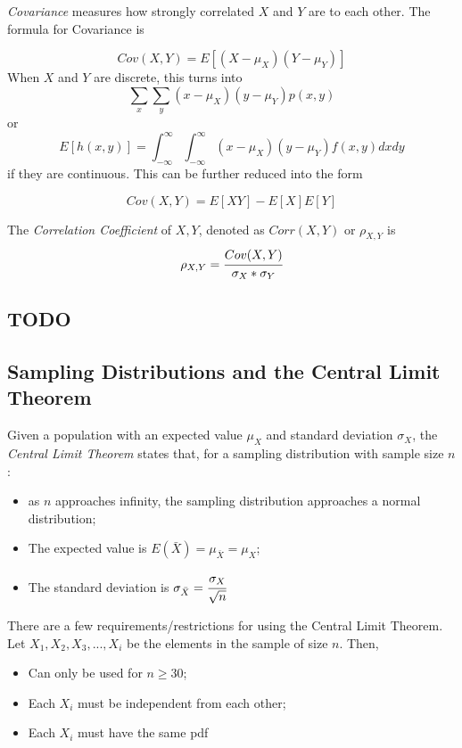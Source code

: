 \documentclass[10pt,twoside,a4paper]{article}
\begin{document}
\begin{multicols*}{2}
\begin{flushleft}
	\textit{Covariance} measures how strongly correlated $X$ and $Y$ are to each other.
	The formula for Covariance is 

	$$ Cov(X, Y) = E[(X - \mu_X)(Y - \mu_Y)] $$
	When $X$ and $Y$ are discrete, this turns into
	$$ \sum_x\sum_y (x - \mu_X)(y - \mu_Y)p(x, y) $$
	or 
	$$ E[h(x,y)] = \int_{-\infty}^{\infty}\int_{-\infty}^{\infty} (x - \mu_X)(y - \mu_Y)f(x, y)dxdy$$
	if they are continuous. This can be further reduced into the form

    $$ Cov(X, Y) = E[XY] - E[X]E[Y] $$


	The \textit{Correlation Coefficient} of $X, Y$, denoted as $Corr(X,Y)$ or $\rho_{X,Y}$ is
	$$ \rho_{X,Y} = \cfrac{Cov(X,Y)}{\sigma_X * \sigma_Y} $$

	\subsection{TODO}
	\subsection{Sampling Distributions and the Central Limit Theorem}
	
	Given a population with an expected value $\mu_X$ and standard deviation $\sigma_X$,
	the \textit{Central Limit Theorem} states that, for a sampling distribution with sample size $n$:
	\begin{itemize}
		\item as $n$ approaches infinity, the sampling distribution approaches a normal distribution;
		\item The expected value is $E(\bar{X}) = \mu_{\bar{X}} = \mu_X$;
		\item The standard deviation is $\sigma_{\bar{X}} = \cfrac{\sigma_X}{\sqrt{n}}$
	\end{itemize}

	There are a few requirements/restrictions for using the Central Limit Theorem.
	Let $X_1, X_2, X_3, ..., X_i$ be the elements in the sample of size $n$. Then,
	\begin{itemize}
		\item Can only be used for $n \geq 30$;
		\item Each $X_i$ must be independent from each other;
		\item Each $X_i$ must have the same pdf
	\end{itemize}



\end{flushleft}
\end{multicols*}
\end{document}
